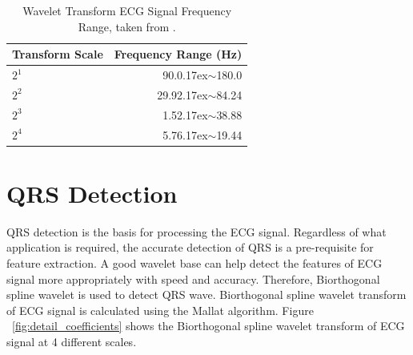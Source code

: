 \renewcommand{\arraystretch}{2}
\begin{table}
	\caption{Wavelet Transform ECG Signal Frequency Range, taken from \cite{shang2014qrs}.} \label{tab:qrsenergy}
	
	\begin{center}
		\begin{tabular}{ | l | r | }
			\hline
			Transform Scale & Frequency Range (Hz) \\ \hline
			${2^1}$  & 90.0{\raise.17ex\hbox{$\scriptstyle\sim$}}180.0 \\ \hline
			${2^2}$  & 29.92{\raise.17ex\hbox{$\scriptstyle\sim$}}84.24  \\ \hline
			${2^3}$  & 1.52{\raise.17ex\hbox{$\scriptstyle\sim$}}38.88  \\ \hline
			${2^4}$  & 5.76{\raise.17ex\hbox{$\scriptstyle\sim$}}19.44  \\ 
			\hline
		\end{tabular}
	\end{center}
	
\end{table}


\section{QRS Detection}\label{sec:ecg_det}
QRS detection is the basis for processing the ECG signal. Regardless of what application is required, the accurate detection of QRS is a pre-requisite for feature extraction. A good wavelet base can help detect the features of ECG signal more appropriately with speed and accuracy. Therefore, Biorthogonal spline wavelet is used to detect QRS wave. Biorthogonal spline wavelet transform of ECG signal is calculated using the Mallat algorithm. Figure ~\ref{fig:detail_coefficients} shows the Biorthogonal spline wavelet transform of ECG signal at 4 different scales.

